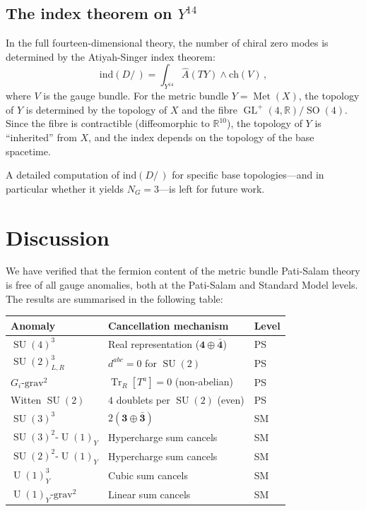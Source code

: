\documentclass[12pt,a4paper]{article}
\theoremstyle{definition}
\newcommand{\Tr}{\operatorname{Tr}}
\newcommand{\Met}{\operatorname{Met}}
\newcommand{\GL}{\operatorname{GL}}
\newcommand{\SO}{\operatorname{SO}}
\newcommand{\SU}{\operatorname{SU}}
\newcommand{\U}{\operatorname{U}}
\newcommand{\R}{\mathbb{R}}
\begin{document}
\subsection{The index theorem on \texorpdfstring{$Y^{14}$}{Y14}}

In the full fourteen-dimensional theory, the number of chiral zero modes is determined by the Atiyah-Singer index theorem:
\begin{equation}
\mathrm{ind}(D\!\!\!\!/\,) = \int_{Y^{14}} \hat{A}(TY) \wedge \mathrm{ch}(V)\,,
\end{equation}
where $V$ is the gauge bundle.
For the metric bundle $Y = \Met(X)$, the topology of $Y$ is determined by the topology of $X$ and the fibre $\GL^+(4,\R)/\SO(4)$.
Since the fibre is contractible (diffeomorphic to $\R^{10}$), the topology of $Y$ is ``inherited'' from $X$, and the index depends on the topology of the base spacetime.

A detailed computation of $\mathrm{ind}(D\!\!\!\!/\,)$ for specific base topologies---and in particular whether it yields $N_G = 3$---is left for future work.


\section{Discussion}
\label{sec:discussion}

We have verified that the fermion content of the metric bundle Pati-Salam theory is free of all gauge anomalies, both at the Pati-Salam and Standard Model levels.
The results are summarised in the following table:

\begin{center}
\renewcommand{\arraystretch}{1.3}
\begin{tabular}{lll}
\toprule
\textbf{Anomaly} & \textbf{Cancellation mechanism} & \textbf{Level} \\
\midrule
$\SU(4)^3$ & Real representation ($\mathbf{4} \oplus \bar{\mathbf{4}}$) & PS \\
$\SU(2)_{L,R}^3$ & $d^{abc} = 0$ for $\SU(2)$ & PS \\
$G_i\text{-grav}^2$ & $\Tr_R[T^a] = 0$ (non-abelian) & PS \\
Witten $\SU(2)$ & $4$ doublets per $\SU(2)$ (even) & PS \\
$\SU(3)^3$ & $2(\mathbf{3} \oplus \bar{\mathbf{3}})$ & SM \\
$\SU(3)^2\text{-}\U(1)_Y$ & Hypercharge sum cancels & SM \\
$\SU(2)^2\text{-}\U(1)_Y$ & Hypercharge sum cancels & SM \\
$\U(1)_Y^3$ & Cubic sum cancels & SM \\
$\U(1)_Y\text{-grav}^2$ & Linear sum cancels & SM \\
\bottomrule
\end{tabular}
\end{center}
\end{document}
